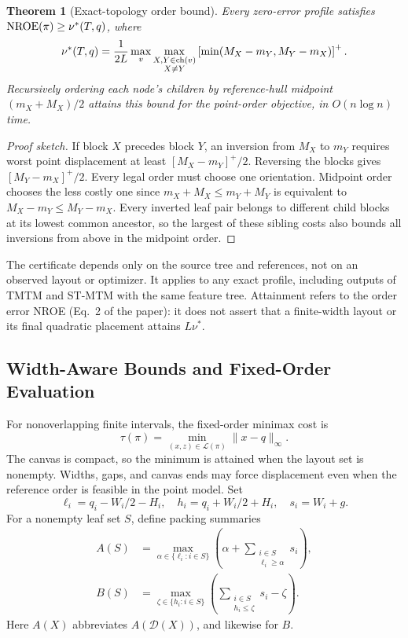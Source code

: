 \documentclass[preprint]{vgtc}   %
\newtheorem{theorem}{Theorem}\newtheorem{lemma}{Lemma}\newtheorem{proposition}{Proposition}
\begin{document}
\begin{theorem}[Exact-topology order bound]\label{thm:order}
Every zero-error profile satisfies $\mathrm{NROE}(\pi)\ge\nu^*(T,q)$, where
\begin{equation}\label{eq:nu}
 \nu^*(T,q)=\frac{1}{2L}\max_v\max_{\substack{X,Y\in\mathrm{ch}(v)\\X\ne Y}}
 \left[\min(M_X-m_Y,M_Y-m_X)\right]^+.
\end{equation}
Recursively ordering each node's children by reference-hull midpoint $(m_X+M_X)/2$ attains this bound for the point-order objective, in $O(n\log n)$ time.
\end{theorem}
\begin{proof}[Proof sketch]
If block $X$ precedes block $Y$, an inversion from $M_X$ to $m_Y$ requires worst point displacement at least $[M_X-m_Y]^+/2$. Reversing the blocks gives $[M_Y-m_X]^+/2$. Every legal order must choose one orientation. Midpoint order chooses the less costly one since $m_X+M_X\le m_Y+M_Y$ is equivalent to $M_X-m_Y\le M_Y-m_X$. Every inverted leaf pair belongs to different child blocks at its lowest common ancestor, so the largest of these sibling costs also bounds all inversions from above in the midpoint order.
\end{proof}
The certificate depends only on the source tree and references, not on an observed layout or optimizer. It applies to any exact profile, including outputs of TMTM and ST-MTM with the same feature tree. Attainment refers to the order error NROE (Eq.~2 of the paper): it does not assert that a finite-width layout or its final quadratic placement attains $L\nu^*$.

\subsection{Width-Aware Bounds and Fixed-Order Evaluation}\label{sec:width}
For nonoverlapping finite intervals, the fixed-order minimax cost is
\begin{equation}\label{eq:tau}
 \tau(\pi)=\min_{(x,z)\in\mathcal{L}(\pi)}\|x-q\|_\infty.
\end{equation}
The canvas is compact, so the minimum is attained when the layout set is nonempty. Widths, gaps, and canvas ends may force displacement even when the reference order is feasible in the point model. Set
\begin{equation}
 \ell_i=q_i-W_i/2-H_i,\quad h_i=q_i+W_i/2+H_i,
 \quad s_i=W_i+g.
\end{equation}
For a nonempty leaf set $S$, define packing summaries
\begin{equation}\label{eq:AB}
\begin{aligned}
 A(S)&=\max_{\alpha\in\{\ell_i:i\in S\}}
 \left(\alpha+\sum_{\substack{i\in S\\\ell_i\ge\alpha}}s_i\right),\\
 B(S)&=\max_{\zeta\in\{h_i:i\in S\}}
 \left(\sum_{\substack{i\in S\\h_i\le\zeta}}s_i-\zeta\right).
\end{aligned}
\end{equation}
Here $A(X)$ abbreviates $A(\mathcal{D}(X))$, and likewise for $B$.
\end{document}
